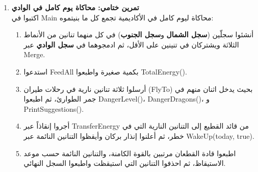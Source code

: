 \documentclass[14pt]{extarticle}
\begin{document}
\begin{enumerate}[resume, label=\textbf{تمرين \arabic*:}, wide=0pt, leftmargin=*, itemsep=2.2em]
    \item \textbf{تمرين ختامي: محاكاة يوم كامل في الوادي} \\
    اكتبوا في \textenglish{Main} محاكاة ليوم كامل في الأكاديمية تجمع كل ما بنيتموه:
    \begin{enumerate}[label=\textbf{\arabic*.}]
        \item أنشئوا سجلّين (\textbf{سجل الشمال} و\textbf{سجل الجنوب}) في كل منهما تنانين من الأنماط الثلاثة ويشتركان في تنينين على الأقل، ثم ادمجوهما في \textbf{سجل الوادي} عبر \textenglish{Merge}.
        \item استدعوا \textenglish{FeedAll} بكمية صغيرة واطبعوا \textenglish{TotalEnergy()}.
        \item أرسلوا ثلاثة تنانين نارية في رحلات طيران (\textenglish{FlyTo}) بحيث يدخل اثنان منهم في جمر الطوارئ، ثم اطبعوا \textenglish{DangerLevel()}، \textenglish{DangerDragons()}، و \textenglish{PrintSuggestions()}.
        \item أجروا إنقاذاً عبر \textenglish{TransferEnergy} من قائد القطيع إلى التنانين النارية التي في خطر، ثم أعلنوا إنذار بركان وأيقظوا التنانين النائمة عبر \textenglish{WakeUp(today, true)}.
        \item اطبعوا قادة القطعان مرتبين بالقوة الكامنة، والتنانين النائمة حسب موعد الاستيقاظ، ثم احذفوا التنانين التي استيقظت واطبعوا السجل النهائي.
    \end{enumerate}

\end{enumerate}
\end{document}
